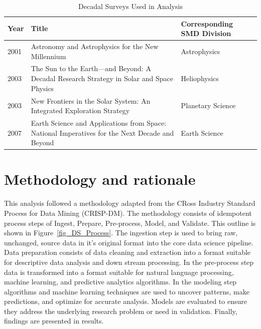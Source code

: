 \documentclass[preprint,12pt,doubleblind]{elsarticle}
\begin{document}
\begin{table}[H]
\centering
\begin{tabular}{p{1.2cm} p{7.5cm} p{3.5cm}}
 \hline
 \rowcolor[gray]{0.95}
 \textbf{Year} & \textbf{Title} & \textbf{Corresponding SMD Division} \\ \hline
 2001 & Astronomy and Astrophysics for the New Millennium & Astrophysics \\
 \rowcolor[gray]{0.97}
 2003 & The Sun to the Earth—and Beyond: A Decadal Research Strategy in Solar and Space Physics & Heliophysics \\
 2003 & New Frontiers in the Solar System: An Integrated Exploration Strategy & Planetary  Science \\
 \rowcolor[gray]{0.97}
 2007 & Earth Science and Applications from Space: National Imperatives for the Next Decade and Beyond & Earth Science \\
\end{tabular}
\caption{Decadal Surveys Used in Analysis \cite{Academies_Decadal, NASA_sci_strat}}\label{tab:Decadals_used}
\end{table}

\section{Methodology and rationale}
\label{meth}
This analysis followed a methodology adapted from the CRoss Industry Standard Process for Data Mining (CRISP-DM)\cite{wirth2000crisp}. The methodology consists of idempotent process steps of Ingest, Prepare, Pre-process, Model, and Validate. This outline is shown in Figure~\ref{fig_DS_Process}. The ingestion step is used to bring raw, unchanged, source data in it's original format into the core data science pipeline. Data preparation consists of data cleaning and extraction into a format suitable for descriptive data analysis and down stream processing. In the pre-process step data is transformed into a format suitable for natural language processing, machine learning, and predictive analytics algorithms. In the modeling step algorithms and machine learning techniques are used to uncover patterns, make predictions, and optimize for accurate analysis. Models are evaluated to ensure they address the underlying research problem or need in validation. Finally, findings are presented in results.
\end{document}
